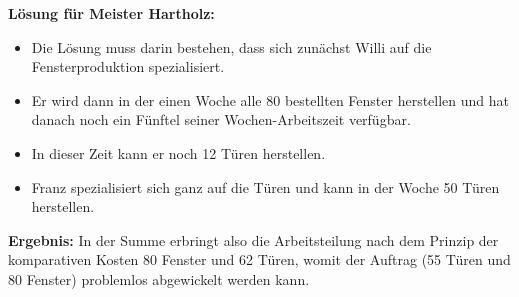 {\textbf{Lösung für Meister Hartholz:}
\begin{itemize}
    \item Die Lösung muss darin bestehen, dass sich zunächst Willi auf die Fensterproduktion spezialisiert.
    \item Er wird dann in der einen Woche alle 80 bestellten Fenster herstellen und hat danach noch ein Fünftel seiner Wochen-Arbeitszeit verfügbar.
    \item In dieser Zeit kann er noch 12 Türen herstellen.
    \item Franz spezialisiert sich ganz auf die Türen und kann in der Woche 50 Türen herstellen.
\end{itemize}

\textbf{Ergebnis:}  
In der Summe erbringt also die Arbeitsteilung nach dem Prinzip der komparativen Kosten 80 Fenster und 62 Türen, womit der Auftrag (55 Türen und 80 Fenster) problemlos abgewickelt werden kann.
}

